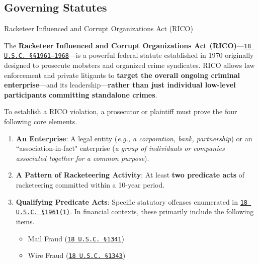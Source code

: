 \documentclass[10pt]{article}
\begin{document}
  \subsection{Governing Statutes}

    \begin{core}{Racketeer Influenced and Corrupt Organizations Act (RICO)}

      The \textbf{Racketeer Influenced and Corrupt Organizations Act (RICO)}---\href{https://home.treasury.gov/system/files/246/18usc1961-1968-rico.pdf}{\texttt{18 U.S.C. \S\S 1961–1968}}---is a powerful federal statute established in 1970 originally designed to prosecute mobsters and organized crime syndicates. RICO allows law enforcement and private litigants to \textbf{target the overall ongoing criminal enterprise}---and its leadership---\textbf{rather than just individual low-level participants committing standalone crimes}.

      To establish a RICO violation, a prosecutor or plaintiff must prove the four following core elements.

      \begin{enumerate}

        \item \textbf{An Enterprise}: A legal entity (\textit{e.g., a corporation, bank, partnership}) or an ``association-in-fact" enterprise (\textit{a group of individuals or companies associated together for a common purpose}). 

        \item \textbf{A Pattern of Racketeering Activity}: At least \textbf{two predicate acts} of racketeering committed within a 10-year period.

        \item \textbf{Qualifying Predicate Acts}: Specific statutory offenses enumerated in \href{https://home.treasury.gov/system/files/246/18usc1961-1968-rico.pdf}{\texttt{18 U.S.C. \S 1961(1)}}. In financial contexts, these primarily include the following items.

        \begin{itemize}

          \item Mail Fraud (\href{https://www.law.cornell.edu/uscode/text/18/1341}{\texttt{18 U.S.C. \S 1341}})

          \item Wire Fraud (\href{https://www.law.cornell.edu/uscode/text/18/1343}{\texttt{18 U.S.C. \S 1343}})


\end{itemize}
\end{enumerate}
\end{core}
\end{document}
